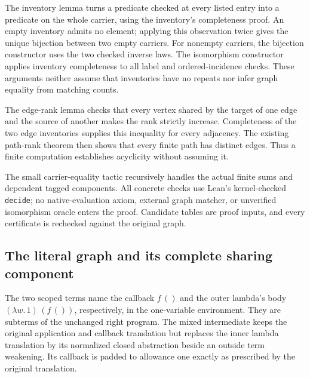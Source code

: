 The inventory lemma turns a predicate checked at every listed entry into a
predicate on the whole carrier, using the inventory's completeness proof.
An empty inventory admits no element; applying this observation twice gives
the unique bijection between two empty carriers. For nonempty carriers, the
bijection constructor uses the two checked inverse laws. The isomorphism
constructor applies inventory completeness to all label and ordered-incidence
checks. These arguments neither assume that inventories have no repeats nor
infer graph equality from matching counts.

The edge-rank lemma checks that every vertex shared by the target of one edge
and the source of another makes the rank strictly increase. Completeness of
the two edge inventories supplies this inequality for every adjacency.
The existing path-rank theorem then shows that every finite path has distinct
edges. Thus a finite computation establishes acyclicity without assuming it.

The small carrier-equality tactic recursively handles the actual finite sums
and dependent tagged components. All concrete checks use Lean's kernel-checked
\texttt{decide}; no native-evaluation axiom, external graph matcher, or
unverified isomorphism oracle enters the proof. Candidate tables are proof
inputs, and every certificate is rechecked against the original graph.

\subsection{The literal graph and its complete sharing component}
The two scoped terms name the callback $f\,()$ and the outer lambda's body
$(\lambda w.\,1)\,(f\,())$, respectively, in the one-variable environment.
They are subterms of the unchanged right program. The mixed intermediate
keeps the original application and callback translation but replaces the
inner lambda translation by its normalized closed abstraction beside an
outside term weakening. Its callback is padded to allowance one exactly
as prescribed by the original translation.

